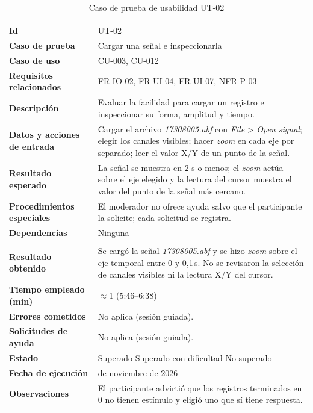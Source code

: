 \documentclass[12pt,letterpaper,oneside]{article}
\DeclareRobustCommand{\_}{\textunderscore\allowbreak}
\newcommand{\fechasesion}{11 de noviembre de 2026}
\newcommand{\casilla}[1]{%
    \fbox{\makebox[1em][c]{#1}}%
}
\begin{document}
\begin{center}
\small
\begin{longtable}{|>{\raggedright\arraybackslash}p{}|>{\raggedright\arraybackslash}p{}|}
\hline
\endfirsthead
\hline
\endhead
\hline
\endfoot
\hline
\caption{Caso de prueba de usabilidad UT-02} \label{tab:ut-02} \\
\endlastfoot
\textbf{Id} & UT-02 \\
\hline
\textbf{Caso de prueba} & Cargar una señal e inspeccionarla \\
\hline
\textbf{Caso de uso} & CU-003, CU-012 \\
\hline
\textbf{Requisitos relacionados} & FR-IO-02, FR-UI-04, FR-UI-07, NFR-P-03 \\
\hline
\textbf{Descripción} & Evaluar la facilidad para cargar un registro e inspeccionar su forma, amplitud y tiempo. \\
\hline
\textbf{Datos y acciones de entrada} & Cargar el archivo \textit{17308005.abf} con \textit{File} > \textit{Open signal}; elegir los canales visibles; hacer \textit{zoom} en cada eje por separado; leer el valor X/Y de un punto de la señal. \\
\hline
\textbf{Resultado esperado} & La señal se muestra en 2 s o menos; el \textit{zoom} actúa sobre el eje elegido y la lectura del cursor muestra el valor del punto de la señal más cercano. \\
\hline
\textbf{Procedimientos especiales} & El moderador no ofrece ayuda salvo que el participante la solicite; cada solicitud se registra. \\
\hline
\textbf{Dependencias} & Ninguna \\
\hline
\multicolumn{2}{|c|}{\textbf{Información para el seguimiento}} \\
\hline
\textbf{Resultado obtenido} & Se cargó la señal \textit{17308005.abf} y se hizo \textit{zoom} sobre el eje temporal entre 0 y 0,1\,s. No se revisaron la selección de canales visibles ni la lectura X/Y del cursor. \\
\hline
\textbf{Tiempo empleado (min)} & $\approx$1 (5:46--6:38) \\
\hline
\textbf{Errores cometidos} & No aplica (sesión guiada). \\
\hline
\textbf{Solicitudes de ayuda} & No aplica (sesión guiada). \\
\hline
\textbf{Estado} & \casilla{x} Superado \qquad \casilla{} Superado con dificultad \qquad \casilla{} No superado \\
\hline
\textbf{Fecha de ejecución} & \fechasesion \\
\hline
\textbf{Observaciones} & El participante advirtió que los registros terminados en 0 no tienen estímulo y eligió uno que sí tiene respuesta. \\
\hline
\end{longtable}
\end{center}
\end{document}
